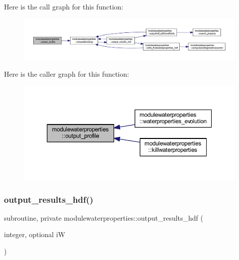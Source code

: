 Here is the call graph for this function\+:\nopagebreak
\begin{figure}[H]
\begin{center}
\leavevmode
\includegraphics[width=350pt]{namespacemodulewaterproperties_adbe4280f2ebe3767932360d61563ff93_cgraph}
\end{center}
\end{figure}
Here is the caller graph for this function\+:\nopagebreak
\begin{figure}[H]
\begin{center}
\leavevmode
\includegraphics[width=350pt]{namespacemodulewaterproperties_adbe4280f2ebe3767932360d61563ff93_icgraph}
\end{center}
\end{figure}
\mbox{\label{namespacemodulewaterproperties_aa0e5621dbf495abbff865260517a210e}} 
\subsubsection{\texorpdfstring{output\+\_\+results\+\_\+hdf()}{output\_results\_hdf()}}
{\footnotesize\ttfamily subroutine, private modulewaterproperties\+::output\+\_\+results\+\_\+hdf (\begin{DoxyParamCaption}\item[{integer, optional}]{iW }\end{DoxyParamCaption})\hspace{0.3cm}{\ttfamily [private]}}

